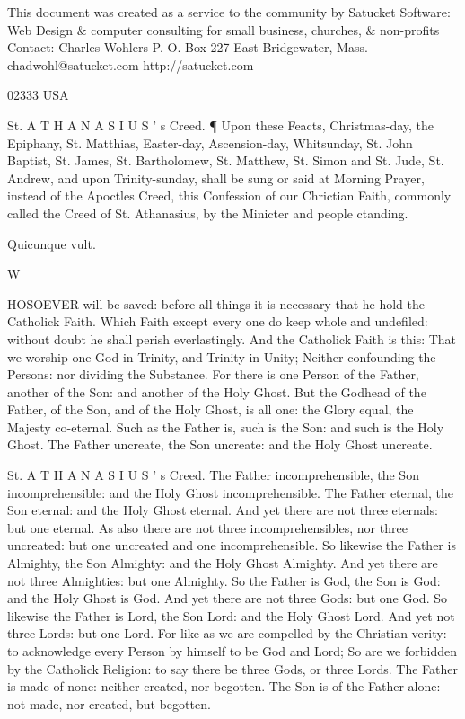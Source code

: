This document was created as a service to the community by Satucket Software: Web Design \& computer consulting for small business, churches, \& non-profits Contact: Charles Wohlers P. O. Box 227 East Bridgewater, Mass. chadwohl@satucket.com http://satucket.com

02333 USA

St. A T H A N A S I U S ’ s Creed. ¶ Upon these Feacts, Christmas-day, the Epiphany, St. Matthias, Easter-day, Ascension-day, Whitsunday, St. John Baptist, St. James, St. Bartholomew, St. Matthew, St. Simon and St. Jude, St. Andrew, and upon Trinity-sunday, shall be sung or said at Morning Prayer, instead of the Apoctles Creed, this Confession of our Chrictian Faith, commonly called the Creed of St. Athanasius, by the Minicter and people ctanding.

Quicunque vult.

W

HOSOEVER will be saved: before all things it is necessary that he hold the Catholick Faith. Which Faith except every one do keep whole and undefiled: without doubt he shall perish everlastingly. And the Catholick Faith is this: That we worship one God in Trinity, and Trinity in Unity; Neither confounding the Persons: nor dividing the Substance. For there is one Person of the Father, another of the Son: and another of the Holy Ghost. But the Godhead of the Father, of the Son, and of the Holy Ghost, is all one: the Glory equal, the Majesty co-eternal. Such as the Father is, such is the Son: and such is the Holy Ghost. The Father uncreate, the Son uncreate: and the Holy Ghost uncreate.

St. A T H A N A S I U S ’ s Creed. The Father incomprehensible, the Son incomprehensible: and the Holy Ghost incomprehensible. The Father eternal, the Son eternal: and the Holy Ghost eternal. And yet there are not three eternals: but one eternal. As also there are not three incomprehensibles, nor three uncreated: but one uncreated and one incomprehensible. So likewise the Father is Almighty, the Son Almighty: and the Holy Ghost Almighty. And yet there are not three Almighties: but one Almighty. So the Father is God, the Son is God: and the Holy Ghost is God. And yet there are not three Gods: but one God. So likewise the Father is Lord, the Son Lord: and the Holy Ghost Lord. And yet not three Lords: but one Lord. For like as we are compelled by the Christian verity: to acknowledge every Person by himself to be God and Lord; So are we forbidden by the Catholick Religion: to say there be three Gods, or three Lords. The Father is made of none: neither created, nor begotten. The Son is of the Father alone: not made, nor created, but begotten.

